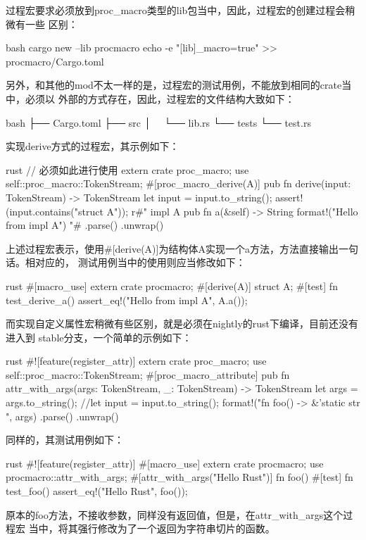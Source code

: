 过程宏要求必须放到proc\_macro类型的lib包当中，因此，过程宏的创建过程会稍微有一些
区别：
\begin{code-block}{bash}
cargo new --lib procmacro
echo -e "[lib]\nproc_macro=true" >> procmacro/Cargo.toml
\end{code-block}

另外，和其他的mod不太一样的是，过程宏的测试用例，不能放到相同的crate当中，必须以
外部的方式存在，因此，过程宏的文件结构大致如下：
\begin{code-block}{bash}
├── Cargo.toml
├── src
│   └── lib.rs
└── tests
    └── test.rs
\end{code-block}

实现derive方式的过程宏，其示例如下：
\begin{code-block}{rust}
// 必须如此进行使用
extern crate proc_macro;
use self::proc_macro::TokenStream;
#[proc_macro_derive(A)]
pub fn derive(input: TokenStream) -> TokenStream {
    let input = input.to_string();
    assert!(input.contains("struct A"));
    r#"
        impl A {
            pub fn a(&self) -> String {
                format!("Hello from impl A")
            }
        }
    "#
    .parse()
    .unwrap()
}
\end{code-block}
上述过程宏表示，使用\#[derive(A)]为结构体A实现一个a方法，方法直接输出一句话。相对应的，
测试用例当中的使用则应当修改如下：
\begin{code-block}{rust}
#[macro_use]
extern crate procmacro;
#[derive(A)]
struct A;
#[test]
fn test_derive_a() {
    assert_eq!("Hello from impl A", A.a());
}
\end{code-block}

而实现自定义属性宏稍微有些区别，就是必须在nightly的rust下编译，目前还没有进入到
stable分支，一个简单的示例如下：
\begin{code-block}{rust}
#![feature(register_attr)]
extern crate proc_macro;
use self::proc_macro::TokenStream;
#[proc_macro_attribute]
pub fn attr_with_args(args: TokenStream, _: TokenStream) -> TokenStream {
    let args = args.to_string();
    //let input = input.to_string();
    format!("fn foo() -> &'static str {{{}}}", args)
        .parse()
        .unwrap()
}
\end{code-block}
同样的，其测试用例如下：
\begin{code-block}{rust}
#![feature(register_attr)]
#[macro_use]
extern crate procmacro;
use procmacro::attr_with_args;
#[attr_with_args("Hello Rust")]
fn foo() {}
#[test]
fn test_foo() {
    assert_eq!("Hello Rust", foo());
}
\end{code-block}
原本的foo方法，不接收参数，同样没有返回值，但是，在attr\_with\_args这个过程宏
当中，将其强行修改为了一个返回为字符串切片的函数。

